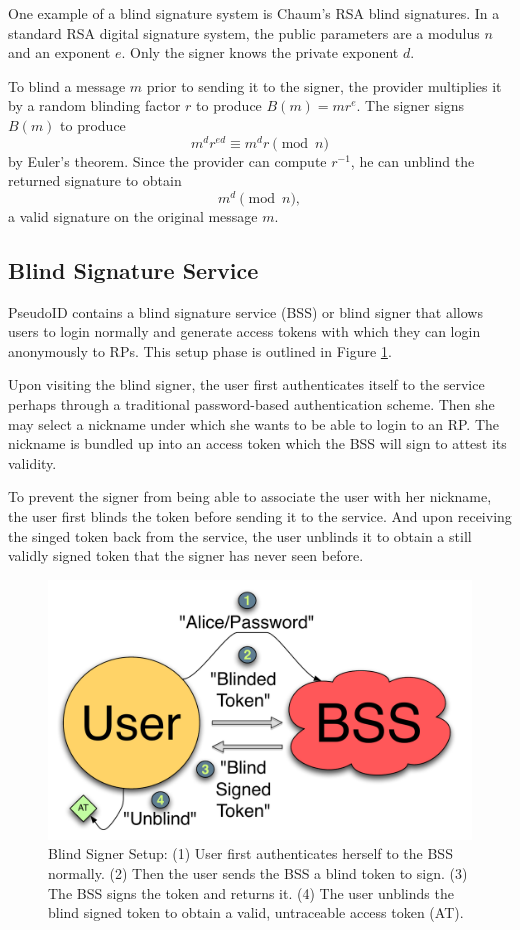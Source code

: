 \documentclass{llncs}
\begin{document}
One example of a blind signature system is Chaum's RSA blind signatures. In a
standard RSA digital signature system, the public parameters are a modulus $n$
and an exponent $e$. Only the signer knows the private exponent $d$.

To blind a message $m$ prior to sending it to the signer, the provider
multiplies it by a random blinding factor $r$ to produce $B(m) = mr^e$. The
signer signs $B(m)$ to produce
$$m^d r^{ed} \equiv m^d r \pmod n$$
by Euler's theorem. Since the provider can compute $r^{-1}$, he can unblind the
returned signature to obtain
$$m^d \pmod n,$$
a valid signature on the original message $m$.


\subsection{Blind Signature Service}

PseudoID contains a blind signature service (BSS) or blind signer that allows
users to login normally and generate access tokens with which they can login
anonymously to RPs. This setup phase is outlined in Figure \ref{fig:bss-setup}.

Upon visiting the blind signer, the user first authenticates itself to the
service perhaps through a traditional password-based authentication scheme. Then
she may select a nickname under which she wants to be able to login to an RP.
The nickname is bundled up into an access token which the BSS will sign to
attest its validity.

To prevent the signer from being able to associate the user with her nickname,
the user first blinds the token before sending it to the service. And upon
receiving the singed token back from the service, the user unblinds it to obtain
a still validly signed token that the signer has never seen before.

\begin{figure}
  \centering
  \includegraphics[scale=0.6]{figs/fig-bss-setup-color.pdf}
  \caption{Blind Signer Setup: (1) User first authenticates herself to the BSS
  normally. (2) Then the user sends the BSS a blind token to sign. (3) The BSS
  signs the token and returns it. (4) The user unblinds the blind signed token
  to obtain a valid, untraceable access token (AT).}
  \label{fig:bss-setup}
\end{figure}
\end{document}
